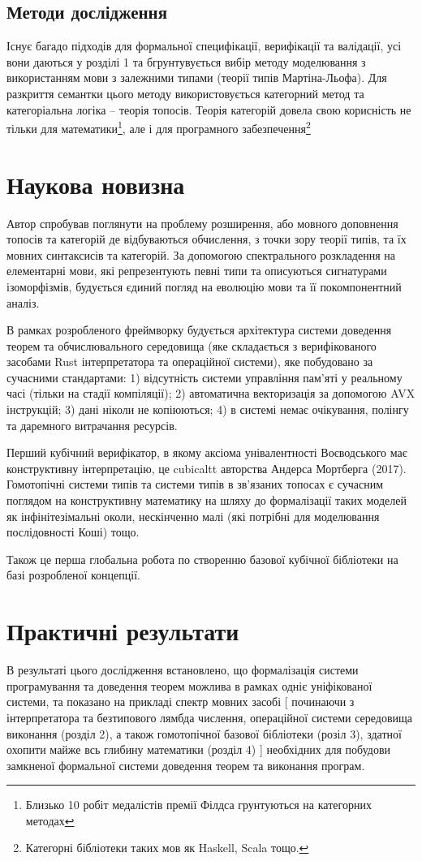 \subsection{Методи дослідження}
Існує багадо підходів для формальної специфікації,
верифікації та валідації, усі вони даються у розділі 1 та
бгрунтувується вибір методу моделювання з використанням
мови з залежними типами (теорії типів Мартіна-Льофа).
Для разкриття семантки цього методу використовується
категорний метод та категоріальна логіка -- теорія топосів.
Теорія категорій довела свою корисність не тільки для
математики\footnote{Близько 10 робіт медалістів премії Філдса грунтуються на категорних методах},
але і для програмного забезпечення\footnote{Категорні бібліотеки таких мов як Haskell, Scala тощо.}

\section{Наукова новизна}
Автор спробував поглянути на проблему розширення, або мовного доповнення
топосів та категорій де відбуваються обчислення, з точки зору теорії типів,
та їх мовних синтаксисів та категорій. За допомогою спектрального розкладення на
елементарні мови, які репрезентують певні типи та описуються сигнатурами ізоморфізмів,
будується єдиний погляд на еволюцію мови та її покомпонентний аналіз.

В рамках розробленого фреймворку будується
архітектура системи доведення теорем та обчислювального
середовища (яке складається з верифікованого засобами Rust
інтерпретатора та операційної системи), яке побудовано за сучасними стандартами:
1) відсутність системи управління пам'яті у реальному часі (тільки на стадії компіляції);
2) автоматична векторизація за допомогою AVX інструкцій;
3) дані ніколи не копіюються;
4) в системі немає очікування, полінгу та даремного витрачання ресурсів.

Перший кубічний верифікатор, в якому аксіома унівалентності
Воєводського має конструктивну інтерпретацію, це cubicaltt авторства Андерса Мортберга (2017).
Гомотопічні системи типів та системи типів в зв'язаних топосах є сучасним поглядом на
конструктивну математику на шляху до формалізації таких моделей як інфінітезімальні околи,
нескінченно малі (які потрібні для моделювання послідовності Коші) тощо.

Також це перша глобальна робота по створенню базової кубічної бібліотеки
на базі розробленої концепції.

\section{Практичні результати}
В результаті цього дослідження встановлено, що формалізація системи
програмування та доведення теорем можлива в рамках одніє уніфікованої
системи, та показано на прикладі спектр мовних засобі [ починаючи з інтерпретатора
та безтипового лямбда числення, операційної системи середовища виконання (розділ 2),
а також гомотопічної базової бібліотеки (розіл 3), здатної охопити майже всь
глибину математики (розділ 4) ] необхідних для побудови замкненої формальної системи
доведення теорем та виконання програм.

